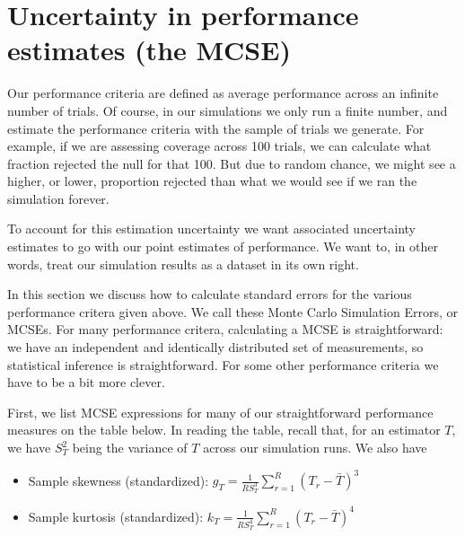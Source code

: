 \documentclass[
]{book}
\providecommand{\tightlist}{%
  \setlength{\itemsep}{0pt}\setlength{\parskip}{0pt}}
\begin{document}
\hypertarget{uncertainty-in-performance-estimates-the-mcse}{%
\section{Uncertainty in performance estimates (the MCSE)}\label{uncertainty-in-performance-estimates-the-mcse}}

Our performance criteria are defined as average performance across an infinite number of trials.
Of course, in our simulations we only run a finite number, and estimate the performance criteria with the sample of trials we generate.
For example, if we are assessing coverage across 100 trials, we can calculate what fraction rejected the null for that 100.
But due to random chance, we might see a higher, or lower, proportion rejected than what we would see if we ran the simulation forever.

To account for this estimation uncertainty we want associated uncertainty estimates to go with our point estimates of performance.
We want to, in other words, treat our simulation results as a dataset in its own right.

In this section we discuss how to calculate standard errors for the various performance critera given above.
We call these Monte Carlo Simulation Errors, or MCSEs.
For many performance critera, calculating a MCSE is straightforward: we have an independent and identically distributed set of measurements, so statistical inference is straightforward.
For some other performance criteria we have to be a bit more clever.

First, we list MCSE expressions for many of our straightforward performance measures on the table below.
In reading the table, recall that, for an estimator \(T\), we have \(S_T^2\) being the variance of \(T\) across our simulation runs.
We also have

\begin{itemize}
\tightlist
\item
  Sample skewness (standardized): \(\displaystyle{g_T = \frac{1}{R S_T^3}\sum_{r=1}^R \left(T_r - \bar{T}\right)^3}\)
\item
  Sample kurtosis (standardized): \(\displaystyle{k_T = \frac{1}{R S_T^4} \sum_{r=1}^R \left(T_r - \bar{T}\right)^4}\)
\end{itemize}
\end{document}
